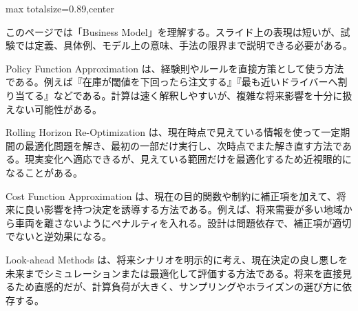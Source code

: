 \begin{minipage}[t]{0.58\textwidth}
\begin{adjustbox}{max totalsize={\textwidth}{0.89\textheight},center}
\begin{minipage}{\textwidth}\scriptsize
{}このページでは「Business Model」を理解する。スライド上の表現は短いが、試験では定義、具体例、モデル上の意味、手法の限界まで説明できる必要がある。\par
Policy Function Approximation は、経験則やルールを直接方策として使う方法である。例えば『在庫が閾値を下回ったら注文する』『最も近いドライバーへ割り当てる』などである。計算は速く解釈しやすいが、複雑な将来影響を十分に扱えない可能性がある。\par
Rolling Horizon Re-Optimization は、現在時点で見えている情報を使って一定期間の最適化問題を解き、最初の一部だけ実行し、次時点でまた解き直す方法である。現実変化へ適応できるが、見えている範囲だけを最適化するため近視眼的になることがある。\par
Cost Function Approximation は、現在の目的関数や制約に補正項を加えて、将来に良い影響を持つ決定を誘導する方法である。例えば、将来需要が多い地域から車両を離さないようにペナルティを入れる。設計は問題依存で、補正項が適切でないと逆効果になる。\par
Look-ahead Methods は、将来シナリオを明示的に考え、現在決定の良し悪しを未来までシミュレーションまたは最適化して評価する方法である。将来を直接見るため直感的だが、計算負荷が大きく、サンプリングやホライズンの選び方に依存する。\par

\end{minipage}
\end{adjustbox}
\end{minipage}
